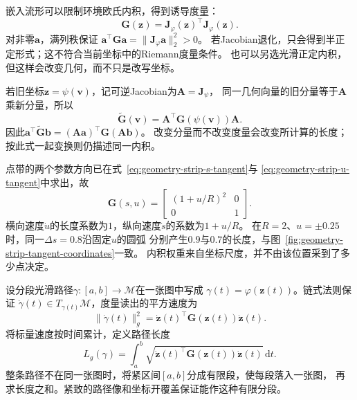 嵌入流形可以限制环境欧氏内积，得到诱导度量：
\begin{equation}
 \bm G(\bm z)=\bm J_\varphi(\bm z)^\top\bm J_\varphi(\bm z).
 \label{eq:geometry-induced-metric}
\end{equation}
对非零$\bm a$，满列秩保证
$\bm a^\top\bm G\bm a=\lVert\bm J_\varphi\bm a\rVert_2^2>0$。
若Jacobian退化，只会得到半正定形式；这不符合当前坐标中的Riemann度量条件。
也可以另选光滑正定内积，但这样会改变几何，而不只是改写坐标。

若旧坐标$\bm z=\psi(\bm v)$，记可逆Jacobian为$\bm A=\bm J_\psi$，
同一几何向量的旧分量等于$\bm A$乘新分量，所以
\begin{equation}
 \widetilde{\bm G}(\bm v)=
 \bm A^\top\bm G(\psi(\bm v))\bm A.
 \label{eq:geometry-metric-coordinate-transform}
\end{equation}
因此$\bm a^\top\widetilde{\bm G}\bm b
=(\bm A\bm a)^\top\bm G(\bm A\bm b)$。
改变分量而不改变度量会改变所计算的长度；按此式一起变换则仍描述同一内积。

点带的两个参数方向已在式~\eqref{eq:geometry-strip-s-tangent}与
\eqref{eq:geometry-strip-u-tangent}中求出，故
\begin{equation}
 \bm G(s,u)=
 \begin{bmatrix}(1+u/R)^2&0\\0&1\end{bmatrix}.
 \label{eq:geometry-strip-metric}
\end{equation}
横向速度$\dot u$的长度系数为$1$，纵向速度$\dot s$的系数为$1+u/R$。
在$R=2$、$u=\pm0.25$时，同一$\Delta s=0.8$沿固定$u$的圆弧
分别产生$0.9$与$0.7$的长度，与图~\ref{fig:geometry-strip-tangent-coordinates}一致。
内积权重来自坐标尺度，并不由该位置采到了多少点决定。


设分段光滑路径$\gamma:[a,b]\to\mathcal M$在一张图中写成
$\gamma(t)=\varphi(\bm z(t))$。链式法则保证
$\dot\gamma(t)\in T_{\gamma(t)}\mathcal M$，度量读出的平方速度为
\begin{equation}
 \lVert\dot\gamma(t)\rVert_g^2
 =\dot{\bm z}(t)^\top\bm G(\bm z(t))\dot{\bm z}(t).
 \label{eq:geometry-riemannian-speed}
\end{equation}
将标量速度按时间累计，定义路径长度
\begin{equation}
 L_g(\gamma)=\int_a^b
 \sqrt{\dot{\bm z}(t)^\top\bm G(\bm z(t))\dot{\bm z}(t)}\,\mathrm dt.
 \label{eq:geometry-riemannian-curve-length}
\end{equation}
整条路径不在同一张图时，将紧区间$[a,b]$分成有限段，使每段落入一张图，
再求长度之和。紧致的路径像和坐标开覆盖保证能作这种有限分段。

